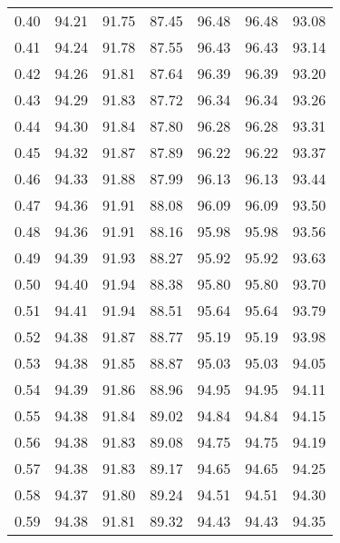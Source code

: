 \begin{tabular}{|c|c|c|c|c|c|c|}
      0.40 &     94.21 &     91.75 &      87.45 &   96.48 &      96.48 &         93.08 \\
      0.41 &     94.24 &     91.78 &      87.55 &   96.43 &      96.43 &         93.14 \\
      0.42 &     94.26 &     91.81 &      87.64 &   96.39 &      96.39 &         93.20 \\
      0.43 &     94.29 &     91.83 &      87.72 &   96.34 &      96.34 &         93.26 \\
      0.44 &     94.30 &     91.84 &      87.80 &   96.28 &      96.28 &         93.31 \\
      0.45 &     94.32 &     91.87 &      87.89 &   96.22 &      96.22 &         93.37 \\
      0.46 &     94.33 &     91.88 &      87.99 &   96.13 &      96.13 &         93.44 \\
      0.47 &     94.36 &     91.91 &      88.08 &   96.09 &      96.09 &         93.50 \\
      0.48 &     94.36 &     91.91 &      88.16 &   95.98 &      95.98 &         93.56 \\
      0.49 &     94.39 &     91.93 &      88.27 &   95.92 &      95.92 &         93.63 \\
      0.50 &     94.40 &     91.94 &      88.38 &   95.80 &      95.80 &         93.70 \\
      0.51 &     94.41 &     91.94 &      88.51 &   95.64 &      95.64 &         93.79 \\
      0.52 &     94.38 &     91.87 &      88.77 &   95.19 &      95.19 &         93.98 \\
      0.53 &     94.38 &     91.85 &      88.87 &   95.03 &      95.03 &         94.05 \\
      0.54 &     94.39 &     91.86 &      88.96 &   94.95 &      94.95 &         94.11 \\
      0.55 &     94.38 &     91.84 &      89.02 &   94.84 &      94.84 &         94.15 \\
      0.56 &     94.38 &     91.83 &      89.08 &   94.75 &      94.75 &         94.19 \\
      0.57 &     94.38 &     91.83 &      89.17 &   94.65 &      94.65 &         94.25 \\
      0.58 &     94.37 &     91.80 &      89.24 &   94.51 &      94.51 &         94.30 \\
      0.59 &     94.38 &     91.81 &      89.32 &   94.43 &      94.43 &         94.35 \\

\end{tabular}
